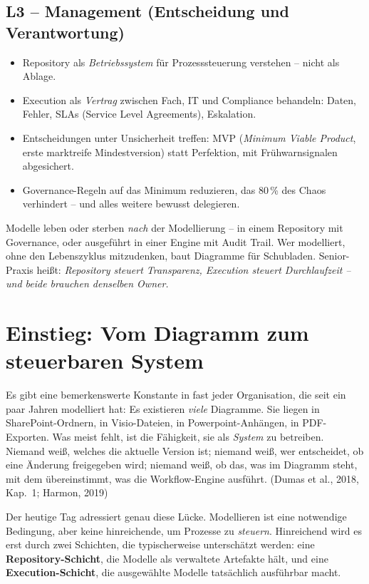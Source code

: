 \documentclass[11pt,a4paper,oneside]{article}
\newcommand{\fachbegriff}[1]{\textbf{#1}}
\newcommand{\quelle}[1]{{\footnotesize\color{lpGray}(#1)}}
\begin{document}
\subsection*{L3 -- Management (Entscheidung und Verantwortung)}
\begin{itemize}
  \item Repository als \emph{Betriebssystem} für Prozesssteuerung verstehen -- nicht als Ablage.
  \item Execution als \emph{Vertrag} zwischen Fach, IT und Compliance behandeln: Daten, Fehler, SLAs (Service Level Agreements), Eskalation.
  \item Entscheidungen unter Unsicherheit treffen: MVP (\emph{Minimum Viable Product}, erste marktreife Mindestversion) statt Perfektion, mit Frühwarnsignalen abgesichert.
  \item Governance-Regeln auf das Minimum reduzieren, das 80\,\% des Chaos verhindert -- und alles weitere bewusst delegieren.
\end{itemize}

\begin{merkbox}
Modelle leben oder sterben \emph{nach} der Modellierung -- in einem Repository mit Governance, oder ausgeführt in einer Engine mit Audit Trail. Wer modelliert, ohne den Lebenszyklus mitzudenken, baut Diagramme für Schubladen. Senior-Praxis heißt: \emph{Repository steuert Transparenz, Execution steuert Durchlaufzeit -- und beide brauchen denselben Owner.}
\end{merkbox}

\clearpage

\section{Einstieg: Vom Diagramm zum steuerbaren System}

Es gibt eine bemerkenswerte Konstante in fast jeder Organisation, die seit ein paar Jahren modelliert hat: Es existieren \emph{viele} Diagramme. Sie liegen in SharePoint-Ordnern, in Visio-Dateien, in Powerpoint-Anhängen, in PDF-Exporten. Was meist fehlt, ist die Fähigkeit, sie als \emph{System} zu betreiben. Niemand weiß, welches die aktuelle Version ist; niemand weiß, wer entscheidet, ob eine Änderung freigegeben wird; niemand weiß, ob das, was im Diagramm steht, mit dem übereinstimmt, was die Workflow-Engine ausführt. \quelle{Dumas et al., 2018, Kap.~1; Harmon, 2019}

Der heutige Tag adressiert genau diese Lücke. Modellieren ist eine notwendige Bedingung, aber keine hinreichende, um Prozesse zu \emph{steuern}. Hinreichend wird es erst durch zwei Schichten, die typischerweise unterschätzt werden: eine \fachbegriff{Repository-Schicht}, die Modelle als verwaltete Artefakte hält, und eine \fachbegriff{Execution-Schicht}, die ausgewählte Modelle tatsächlich ausführbar macht.
\end{document}
